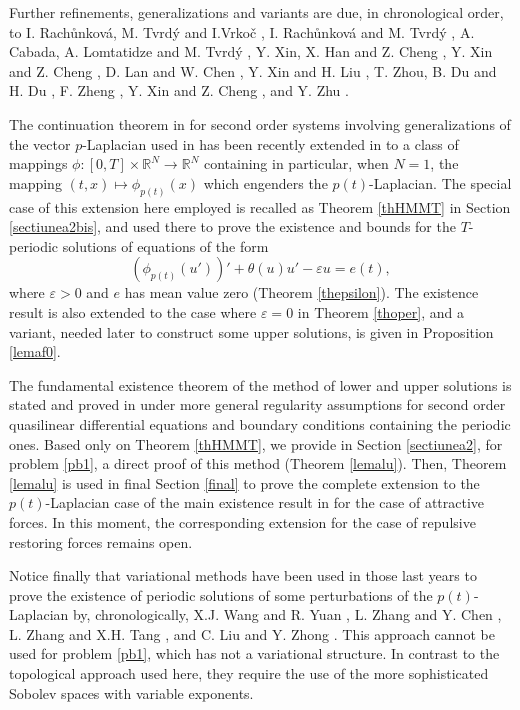 \documentclass[11pt]{amsart}
\numberwithin{equation}{section} \textwidth=15.5cm
\begin{document}
Further refinements, generalizations and variants are due, in chronological order, to I. Rach\r{u}nkov\'{a}, M. Tvrd\'{y} and I.Vrko\v{c} \cite{[RTV]}, I. Rach\r{u}nkov\'{a} and M. Tvrd\'{y} \cite{[RaT1],[RaT2],[RaT3]}, A. Cabada, A. Lom\-ta\-ti\-dze and M. Tvrd\'y \cite{[CLT]}, Y. Xin, X. Han and Z. Cheng \cite{[XHC]}, Y. Xin and Z. Cheng \cite{[XiC1],[XiC2]}, D. Lan and W. Chen \cite{[LaC]}, Y. Xin and H. Liu \cite{[XiL]}, T. Zhou, B. Du and H. Du \cite{[ZDD]}, F. Zheng \cite{[Zhe]}, Y. Xin and Z. Cheng \cite{[XiC3]}, and Y. Zhu \cite{[Zhu]}.
\medskip

The continuation theorem in \cite{[MaM]} for second order systems involving generalizations of the vector $p$-Laplacian used in \cite{[JMANS]} has been recently extended in \cite{[HMMT]} to a class of mappings $\phi : [0,T] \times \mathbb R^N \to \mathbb R^N$ containing in particular, when $N=1$, the mapping $(t,x) \mapsto \phi_{p(t)}(x)$ which engenders the $p(t)$-Laplacian.
The special case of this extension here employed is recalled as Theorem \ref{thHMMT} in Section \ref{sectiunea2bis}, and used there to prove the existence and bounds for the $T$-periodic solutions of equations of the form
$$ (\phi_{p(t)}(u'))'+\theta(u)u'-\varepsilon u=e(t),$$
where $\varepsilon > 0$ and $e$ has mean value zero (Theorem \ref{thepsilon}). The existence result is also extended to the case where $\varepsilon = 0$ in Theorem \ref{thoper},
 and a variant, needed later to construct some upper solutions, is given in Proposition \ref{lemaf0}.
\medskip

The fundamental existence theorem of the method of lower and upper solutions is stated and proved in \cite{[MaT2]}
under more general regularity assumptions for second order quasilinear differential equations and boundary conditions containing the periodic ones.
Based only on Theorem \ref{thHMMT}, we provide in Section \ref{sectiunea2}, for problem \eqref{pb1}, a direct proof of this method (Theorem \ref{lemalu}). Then, Theorem \ref{lemalu} is used in final Section \ref{final} to prove the complete extension to the $p(t)$-Laplacian case of the main existence result in \cite{[JMANS]} for the case of attractive forces. In this moment, the corresponding extension for the case of repulsive restoring forces remains open.
\medskip

Notice finally that variational methods have been used in those last years to prove the existence of periodic solutions of some perturbations of the $p(t)$-Laplacian by, chronologically, X.J. Wang and R. Yuan \cite{[WaY]}, L. Zhang and Y. Chen \cite{[ZhC]}, L. Zhang and X.H. Tang \cite{[ZhT]}, and C. Liu and Y. Zhong \cite{[LiZ]}. This approach cannot be used for problem \eqref{pb1}, which has not a variational structure. In contrast to the topological approach used here, they require the use of the more sophisticated Sobolev spaces with variable exponents.
\end{document}

